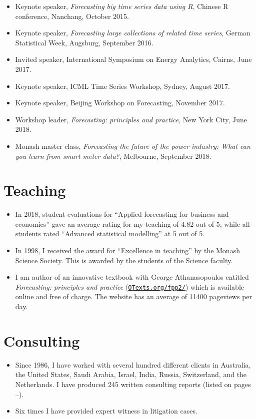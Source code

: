 \documentclass[10pt,a4paper,]{article}
\providecommand{\tightlist}{%
  \setlength{\itemsep}{0pt}\setlength{\parskip}{0pt}}
\begin{document}
\begin{itemize}
\item
  Keynote speaker, \emph{Forecasting big time series data using R}, Chinese R conference, Nanchang, October 2015.
\item
  Keynote speaker, \emph{Forecasting large collections of related time series}, German Statistical Week, Augsburg, September 2016.
\item
  Invited speaker, International Symposium on Energy Analytics, Cairns, June 2017.
\item
  Keynote speaker, ICML Time Series Workshop, Sydney, August 2017.
\item
  Keynote speaker, Beijing Workshop on Forecasting, November 2017.
\item
  Workshop leader, \emph{Forecasting: principles and practice}, New York City, June 2018.
\item
  Monash master class, \emph{Forecasting the future of the power industry: What can you learn from smart meter data?}, Melbourne, September 2018.
\end{itemize}

\hypertarget{teaching}{%
\section{Teaching}\label{teaching}}

\begin{itemize}
\tightlist
\item
  In 2018, student evaluations for ``Applied forecasting for business and economics'' gave an average rating for my teaching of 4.82 out of 5, while all students rated ``Advanced statistical modelling'' at 5 out of 5.
\item
  In 1998, I received the award for ``Excellence in teaching'' by the Monash Science Society. This is awarded by the students of the Science faculty.
\item
  I am author of an innovative textbook with George Athanasopoulos entitled \emph{Forecasting: principles and practice} (\href{https://OTexts.org/fpp2}{\texttt{OTexts.org/fpp2/}}) which is available online and free of charge. The website has an average of 11400 pageviews per day.
\end{itemize}

\hypertarget{consulting}{%
\section{Consulting}\label{consulting}}

\begin{itemize}
\tightlist
\item
  Since 1986, I have worked with several hundred different clients in Australia, the United States, Saudi Arabia, Israel, India, Russia, Switzerland, and the Netherlands. I have produced 245 written consulting reports (listed on pages \pageref{consultingstart}--\pageref{consultingend}).
\item
  Six times I have provided expert witness in litigation cases.
\end{itemize}
\end{document}
